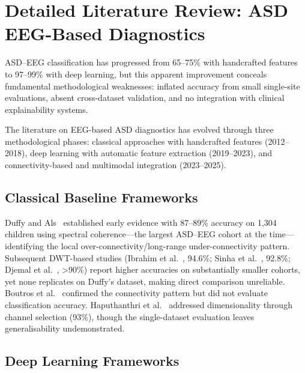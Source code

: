 
\section{Detailed Literature Review: ASD EEG-Based Diagnostics}
\label{app:ch2_asd}
\label{sec:topic1_asd}

ASD--EEG classification has progressed from 65--75\% with handcrafted features to 97--99\% with deep learning, but this apparent improvement conceals fundamental methodological weaknesses: inflated accuracy from small single-site evaluations, absent cross-dataset validation, and no integration with clinical explainability systems.

The literature on EEG-based ASD diagnostics has evolved through three methodological phases: classical approaches with handcrafted features (2012--2018), deep learning with automatic feature extraction (2019--2023), and connectivity-based and multimodal integration (2023--2025).

\subsection{Classical Baseline Frameworks}

Duffy and Als~\cite{duffy2012coherence} established early evidence with 87--89\% accuracy on 1,304 children using spectral coherence---the largest ASD--EEG cohort at the time---identifying the local over-connectivity/long-range under-connectivity pattern. Subsequent DWT-based studies (Ibrahim et al.~\cite{ibrahim2018epilepsy}, 94.6\%; Sinha et al.~\cite{sinha2022asd}, 92.8\%; Djemal et al.~\cite{djemal2017asd}, >90\%) report higher accuracies on substantially smaller cohorts, yet none replicates on Duffy's dataset, making direct comparison unreliable. Boutros et al.~\cite{boutros2015eeg} confirmed the connectivity pattern but did not evaluate classification accuracy. Haputhanthri et al.~\cite{haputhanthri2019channel} addressed dimensionality through channel selection (93\%), though the single-dataset evaluation leaves generalisability undemonstrated.

\subsection{Deep Learning Frameworks}

